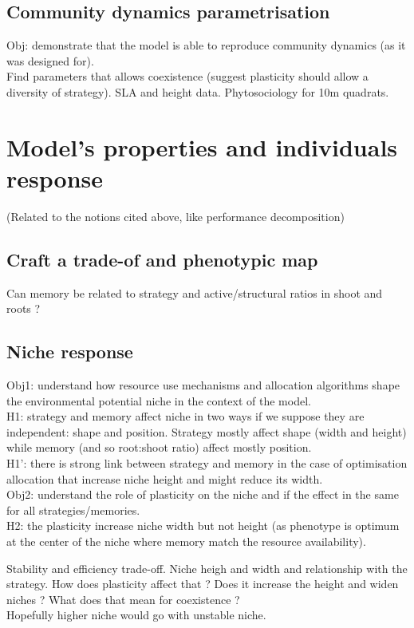 \documentclass[english,10pt]{article}
\begin{document}
\subsection{Community dynamics parametrisation}
Obj: demonstrate that the model is able to reproduce community dynamics (as it was designed for).\\
Find parameters that allows coexistence (suggest plasticity should allow a diversity of strategy). SLA and height data. Phytosociology for 10m quadrats.

\section{Model's properties and individuals response}
(Related to the notions cited above, like performance decomposition)

\subsection{Craft a trade-of and phenotypic map}
Can memory be related to strategy and active/structural ratios in shoot and roots ?

\subsection{Niche response}
Obj1: understand how resource use mechanisms and allocation algorithms shape the environmental potential niche in the context of the model.\\
H1: strategy and memory affect niche in two ways if we suppose they are independent: shape and position. Strategy mostly affect shape (width and height) while memory (and so root:shoot ratio) affect mostly position.\\
H1': there is strong link between strategy and memory in the case of optimisation allocation that increase niche height and might reduce its width.\\
Obj2: understand the role of plasticity on the niche and if the effect in the same for all strategies/memories.\\
H2: the plasticity increase niche width but not height (as phenotype is optimum at the center of the niche where memory match the resource availability).

Stability and efficiency trade-off. Niche heigh and width and relationship with the strategy. How does plasticity affect that ? Does it increase the height and widen niches ? What does that mean for coexistence ?\\
Hopefully higher niche would go with unstable niche.
\end{document}
